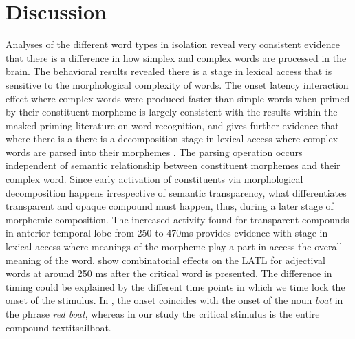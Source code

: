\documentclass{frontiersSCNS}
\begin{document}
\section{Discussion}
	Analyses of the different word types in isolation reveal very consistent evidence that there is a difference in how simplex and complex words are processed in the brain. The behavioral results revealed there is a stage in lexical access that is sensitive to the morphological complexity of words. The onset latency interaction effect where complex words were produced faster than simple words when primed by their constituent morpheme is largely consistent with the results within the masked priming literature on word recognition, and gives further evidence that where there is a there is a decomposition stage in lexical access where complex words are parsed into their morphemes \citep{Rastle:2004, Taft:2004, Morris:2007, McCormick:2008, Fiorentino:2009}. The parsing operation occurs independent of semantic relationship between constituent morphemes and their complex word. 
	Since early activation of constituents via morphological decomposition happens irrespective of semantic transparency, what differentiates transparent and opaque compound must happen, thus, during a later stage of morphemic composition.
The increased activity found for transparent compounds in anterior temporal lobe from 250 to 470ms provides evidence with stage in lexical access where meanings of the morpheme play a part in access the overall meaning of the word. \cite{Bemis:2011} show combinatorial effects on the LATL for adjectival words at around 250 ms after the critical word is presented.  The difference in timing could be explained by the different time points in which we time lock the onset of the stimulus. In \cite{Bemis:2011}, the onset coincides with the onset of the noun \textit{boat} in the phrase \textit{red boat}, whereas in our study the critical stimulus is the entire compound textit{sailboat}.
\end{document}
